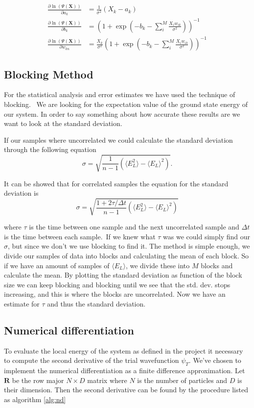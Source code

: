 \begin{align}
    \frac{\partial \ln( \Psi(\mathbf{X}) )}{\partial a_k} &= \frac{1}{\sigma ^2} (X_k - a_k)\\
    \frac{\partial \ln( \Psi(\mathbf{X}) )}{\partial b_k} &= \left(1 +  \exp\left(- b_k  - \sum_i^M \frac{X_i w_{ik}}{\sigma^2}\right)  \right)^{-1}  \\
    \frac{\partial \ln( \Psi(\mathbf{X}) )}{\partial w_{kn}}& = \frac{X_k}{\sigma^2} \left(1 +  \exp\left(- b_k  - \sum_i^M \frac{X_i w_{ik}}{\sigma^2}\right)  \right)^{-1}   
\end{align}



\subsection{Blocking Method}

For the statistical analysis and error estimates we have used the technique of blocking. \
We are looking for the expectation value of the ground state energy of our system. In order to say something about how accurate these results are we want to look at the standard deviation. 

If our samples where uncorrelated we could calculate the standard deviation through the following equation 
$$\sigma = \sqrt{\frac{1}{n - 1} \left(\langle E_L^2\rangle - \langle E_L \rangle^2\right)}.$$

It can be showed that for correlated samples the equation for the standard deviation is
$$\sigma = \sqrt{\frac{1 + 2 \tau / \Delta t}{n - 1} \left(\langle E_L^2\rangle - \langle E_L \rangle^2\right)}$$

where $\tau$ is the time between one sample and the next uncorrelated sample and $\Delta t$ is the time between each sample.\
If we knew what $\tau$ was we could simply find our $\sigma$, but since we don't we use blocking to find it. The method is simple enough, we divide our samples of data into blocks and calculating the mean of each block. So if we have an amount of samples of $\langle E_L \rangle$, we divide these into $M$ blocks and calculate the mean. By plotting the standard deviation as function of the block size we can keep blocking and blocking until we see that the std. dev. stops increasing, and this is where the blocks are uncorrelated. Now we have an estimate for $\tau$ and thus the standard deviation.


\subsection{Numerical differentiation}
To evaluate the local energy of the system as defined in the project it necessary to compute the second derivative of the trial wavefunction $\psi_T$. We've chosen to implement the numerical differentiation as a finite difference approximation. Let $\mathbf{R}$ be the row major $N \times D$ matrix where $N$ is the number of particles and $D$ is their dimension. Then the second derivative can be found by the procedure listed as algorithm \ref{alg:nd}

